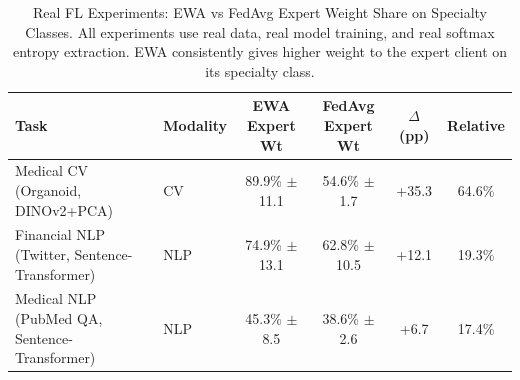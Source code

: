 \begin{table}[t]
\centering
\caption{Real FL Experiments: EWA vs FedAvg Expert Weight Share on Specialty Classes.
All experiments use real data, real model training, and real softmax entropy extraction.
EWA consistently gives higher weight to the expert client on its specialty class.}
\label{tab:all_real}
\begin{tabular}{llcccc}
\toprule
Task & Modality & EWA Expert Wt & FedAvg Expert Wt & $\Delta$ (pp) & Relative \\
\midrule
Medical CV (Organoid, DINOv2+PCA) & CV & 89.9\% $\pm$ 11.1 & 54.6\% $\pm$ 1.7 & +35.3 & 64.6\% \\
\midrule
Financial NLP (Twitter, Sentence-Transformer) & NLP & 74.9\% $\pm$ 13.1 & 62.8\% $\pm$ 10.5 & +12.1 & 19.3\% \\
\midrule
Medical NLP (PubMed QA, Sentence-Transformer) & NLP & 45.3\% $\pm$ 8.5 & 38.6\% $\pm$ 2.6 & +6.7 & 17.4\% \\
\midrule
\bottomrule
\end{tabular}
\end{table}
